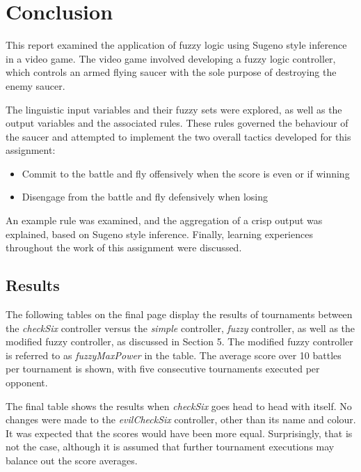 \newpage

\section{Conclusion}

This report examined the application of fuzzy logic using Sugeno style inference in a video game. The video game involved developing a fuzzy logic controller, which controls an armed flying saucer with the sole purpose of destroying the enemy saucer.

The linguistic input variables and their fuzzy sets were explored, as well as the output variables and the associated rules. These rules governed the behaviour of the saucer and attempted to implement the two overall tactics developed for this assignment:

\begin{itemize}
	\item Commit to the battle and fly offensively when the score is even or if winning
	\item Disengage from the battle and fly defensively when losing
\end{itemize}

An example rule was examined, and the aggregation of a crisp output was explained, based on Sugeno style inference. Finally, learning experiences throughout the work of this assignment were discussed.

\subsection{Results}

The following tables on the final page display the results of tournaments between the \emph{checkSix} controller versus the \emph{simple} controller, \emph{fuzzy} controller, as well as the modified fuzzy controller, as discussed in Section 5. The modified fuzzy controller is referred to as \emph{fuzzyMaxPower} in the table. The average score over 10 battles per tournament is shown, with five consecutive tournaments executed per opponent.

The final table shows the results when \emph{checkSix} goes head to head with itself. No changes were made to the \emph{evilCheckSix} controller, other than its name and colour. It was expected that the scores would have been more equal. Surprisingly, that is not the case, although it is assumed that further tournament executions may balance out the score averages.

\newpage

